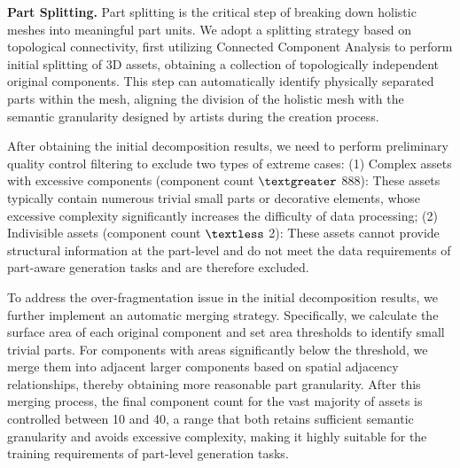 \documentclass{article} %
\begin{document}
\textbf{Part Splitting.} Part splitting is the critical step of breaking down holistic meshes into meaningful part units. We adopt a splitting strategy based on topological connectivity, first utilizing Connected Component Analysis to perform initial splitting of 3D assets, obtaining a collection of topologically independent original components. This step can automatically identify physically separated parts within the mesh, aligning the division of the holistic mesh with the semantic granularity designed by artists during the creation process.

After obtaining the initial decomposition results, we need to perform preliminary quality control filtering to exclude two types of extreme cases: (1) Complex assets with excessive components (component count $\textgreater$ 888): These assets typically contain numerous trivial small parts or decorative elements, whose excessive complexity significantly increases the difficulty of data processing; (2) Indivisible assets (component count $\textless$ 2): These assets cannot provide structural information at the part-level and do not meet the data requirements of part-aware generation tasks and are therefore excluded.

To address the over-fragmentation issue in the initial decomposition results, we further implement an automatic merging strategy. Specifically, we calculate the surface area of each original component and set area thresholds to identify small trivial parts. For components with areas significantly below the threshold, we merge them into adjacent larger components based on spatial adjacency relationships, thereby obtaining more reasonable part granularity. After this merging process, the final component count for the vast majority of assets is controlled between 10 and 40, a range that both retains sufficient semantic granularity and avoids excessive complexity, making it highly suitable for the training requirements of part-level generation tasks.
\end{document}
